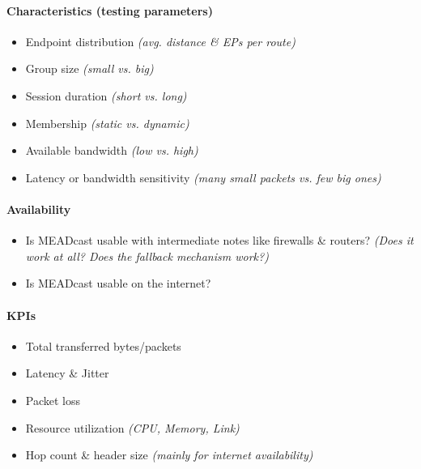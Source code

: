 \paragraph{Characteristics (testing parameters)} %
\label{par:Characteristics}
\begin{itemize}
    \item Endpoint distribution \textit{(avg. distance \& EPs per route)}
    \item Group size \textit{(small vs. big)}
    \item Session duration \textit{(short vs. long)}
    \item Membership \textit{(static vs. dynamic)}
    \item Available bandwidth \textit{(low vs. high)}
    \item Latency or bandwidth sensitivity
        \textit{(many small packets vs. few big ones)}
\end{itemize}

\paragraph{Availability} %
\label{par:Availability}
\begin{itemize}
    \item Is MEADcast usable with intermediate notes like firewalls \& routers?
        \textit{(Does it work at all? Does the fallback mechanism work?)}
    \item Is MEADcast usable on the internet?
\end{itemize}

\paragraph{KPIs} %
\label{par:KPIs}
\begin{itemize}
    \item Total transferred bytes/packets
    \item Latency \& Jitter
    \item Packet loss
    \item Resource utilization \textit{(CPU, Memory, Link)}
    \item Hop count \& header size \textit{(mainly for internet availability)}
\end{itemize}


